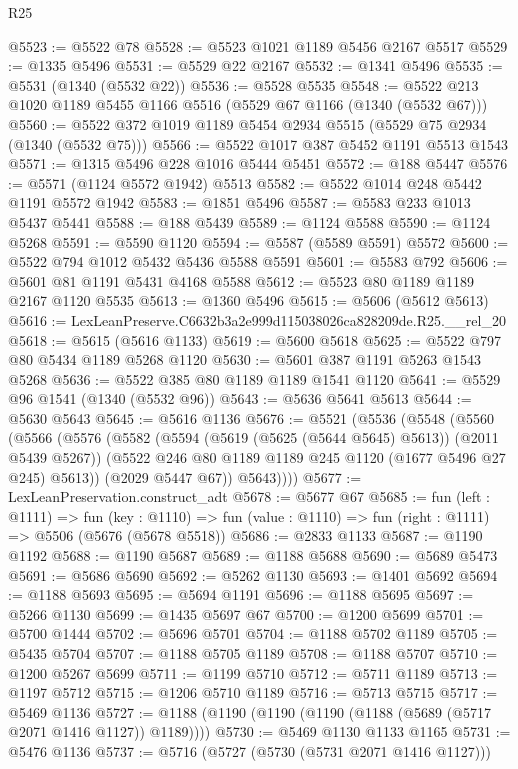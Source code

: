 \begin{lexlean}{R25}
\begin{coremodule}
@5523 := @5522 @78
@5528 := @5523 @1021 @1189 @5456 @2167 @5517
@5529 := @1335 @5496
@5531 := @5529 @22 @2167
@5532 := @1341 @5496
@5535 := @5531 (@1340 (@5532 @22))
@5536 := @5528 @5535
@5548 := @5522 @213 @1020 @1189 @5455 @1166 @5516 (@5529 @67 @1166 (@1340 (@5532 @67)))
@5560 := @5522 @372 @1019 @1189 @5454 @2934 @5515 (@5529 @75 @2934 (@1340 (@5532 @75)))
@5566 := @5522 @1017 @387 @5452 @1191 @5513 @1543
@5571 := @1315 @5496 @228 @1016 @5444 @5451
@5572 := @188 @5447
@5576 := @5571 (@1124 @5572 @1942) @5513
@5582 := @5522 @1014 @248 @5442 @1191 @5572 @1942
@5583 := @1851 @5496
@5587 := @5583 @233 @1013 @5437 @5441
@5588 := @188 @5439
@5589 := @1124 @5588
@5590 := @1124 @5268
@5591 := @5590 @1120
@5594 := @5587 (@5589 @5591) @5572
@5600 := @5522 @794 @1012 @5432 @5436 @5588 @5591
@5601 := @5583 @792
@5606 := @5601 @81 @1191 @5431 @4168 @5588
@5612 := @5523 @80 @1189 @1189 @2167 @1120 @5535
@5613 := @1360 @5496
@5615 := @5606 (@5612 @5613)
@5616 := LexLeanPreserve.C6632b3a2e999d115038026ca828209de.R25.__rel_20
@5618 := @5615 (@5616 @1133)
@5619 := @5600 @5618
@5625 := @5522 @797 @80 @5434 @1189 @5268 @1120
@5630 := @5601 @387 @1191 @5263 @1543 @5268
@5636 := @5522 @385 @80 @1189 @1189 @1541 @1120
@5641 := @5529 @96 @1541 (@1340 (@5532 @96))
@5643 := @5636 @5641 @5613
@5644 := @5630 @5643
@5645 := @5616 @1136
@5676 := @5521
    (@5536
      (@5548
        (@5560
          (@5566
            (@5576
              (@5582
                (@5594 (@5619 (@5625 (@5644 @5645) @5613)) (@2011 @5439 @5267))
                (@5522 @246 @80 @1189 @1189 @245 @1120 (@1677 @5496 @27 @245) @5613))
              (@2029 @5447 @67))
            @5643))))
@5677 := LexLeanPreservation.construct_adt
@5678 := @5677 @67
@5685 := fun (left : @1111) =>
  fun (key : @1110) => fun (value : @1110) => fun (right : @1111) => @5506 (@5676 (@5678 @5518))
@5686 := @2833 @1133
@5687 := @1190 @1192
@5688 := @1190 @5687
@5689 := @1188 @5688
@5690 := @5689 @5473
@5691 := @5686 @5690
@5692 := @5262 @1130
@5693 := @1401 @5692
@5694 := @1188 @5693
@5695 := @5694 @1191
@5696 := @1188 @5695
@5697 := @5266 @1130
@5699 := @1435 @5697 @67
@5700 := @1200 @5699
@5701 := @5700 @1444
@5702 := @5696 @5701
@5704 := @1188 @5702 @1189
@5705 := @5435 @5704
@5707 := @1188 @5705 @1189
@5708 := @1188 @5707
@5710 := @1200 @5267 @5699
@5711 := @1199 @5710
@5712 := @5711 @1189
@5713 := @1197 @5712
@5715 := @1206 @5710 @1189
@5716 := @5713 @5715
@5717 := @5469 @1136
@5727 := @1188 (@1190 (@1190 (@1190 (@1188 (@5689 (@5717 @2071 @1416 @1127)) @1189))))
@5730 := @5469 @1130 @1133 @1165
@5731 := @5476 @1136
@5737 := @5716 (@5727 (@5730 (@5731 @2071 @1416 @1127)))

\end{coremodule}
\end{lexlean}
